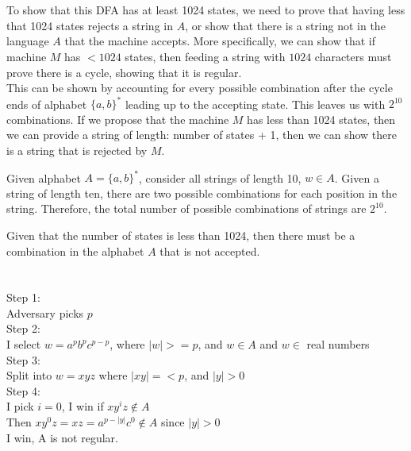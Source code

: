 \documentclass[10pt,letterpaper]{article}
\begin{document}
\section{}
To show that this DFA has at least 1024 states, we need to prove that having
less that 1024 states rejects a string in $A$, or show that there is a string
not in the language $A$ that the machine accepts. More specifically, we can
show that if machine $M$ has $<1024$ states, then feeding a string with $1024$
characters must prove there is a cycle, showing that it is regular.\\

This can be shown by accounting for every possible combination after the cycle
ends of alphabet $\{a,b\}^*$ leading up to the accepting state. This leaves us
with $2^{10}$ combinations. If we propose that the machine $M$ has less than 1024
states, then we can provide a string of length: number of states + 1, then we
can show there is a string that is rejected by $M$.

Given alphabet $A=\{a,b\}^*$, consider all strings of length 10, $w\in A$. Given
a string of length ten, there are two possible combinations for each position
in the string. Therefore, the total number of possible combinations of strings
are $2^{10}$.

Given that the number of states is less than 1024, then there must be a
combination in the alphabet $A$ that is not accepted. 

\section{}
Step 1:\\
Adversary picks $p$\\
Step 2:\\
I select $w=a^p b^p c^{p-p}$, where $|w|>=p$, and $w \in A$ and $w \in
$ real numbers\\
Step 3:\\
Split into $w=xyz$ where $|xy|=<p$, and $|y|>0$ \\
Step 4:\\
I pick $i=0$, I win if $xy^iz \notin A$\\
Then $xy^0z=xz=a^{p-|y|}c^0 \notin A$ since $|y|>0$\\
I win, A is not regular. 
\end{document}
